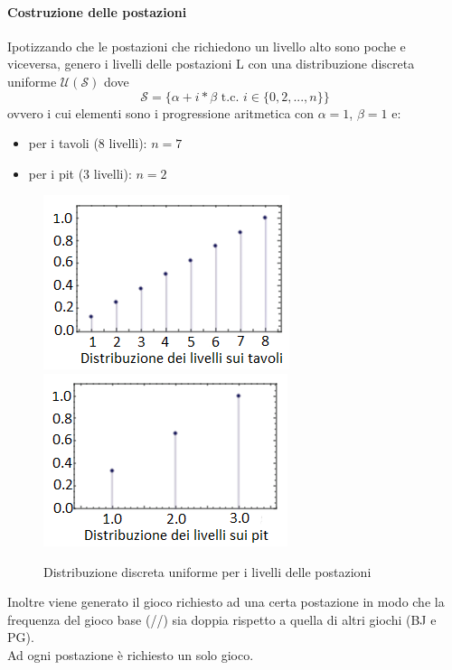     \paragraph{Costruzione delle postazioni} Ipotizzando che le postazioni che richiedono un livello alto sono poche e viceversa, genero i livelli delle postazioni L con una distribuzione discreta uniforme $\mathcal{U}(\mathcal{S})$ dove \[\mathcal{S} = \{ \alpha + i*\beta \text{ t.c. } i \in \{0,2,...,n\} \} \] ovvero i cui elementi sono i progressione aritmetica con $\alpha = 1$, $\beta = 1$ e:
    \begin{itemize}
        \item per i tavoli (8 livelli): $n = 7$
        \item per i pit (3 livelli): $n = 2$
    \end{itemize}
    \begin{figure}[!htb]
        \begin{widepage}
            \centering
            \includegraphics[width=.49\textwidth]{../immagini/discr_livelli_tavoli.png}\hfil
            \includegraphics[width=.49\textwidth]{../immagini/discr_livelli_pit.png}
            \caption{Distribuzione discreta uniforme per i livelli delle postazioni}
        \end{widepage}
    \end{figure}
    \FloatBarrier
    \noindent
    Inoltre viene generato il gioco richiesto ad una certa postazione in modo che la frequenza del gioco base (//) sia doppia rispetto a quella di altri giochi (BJ e PG).\\
    Ad ogni postazione è richiesto un solo gioco.
    
